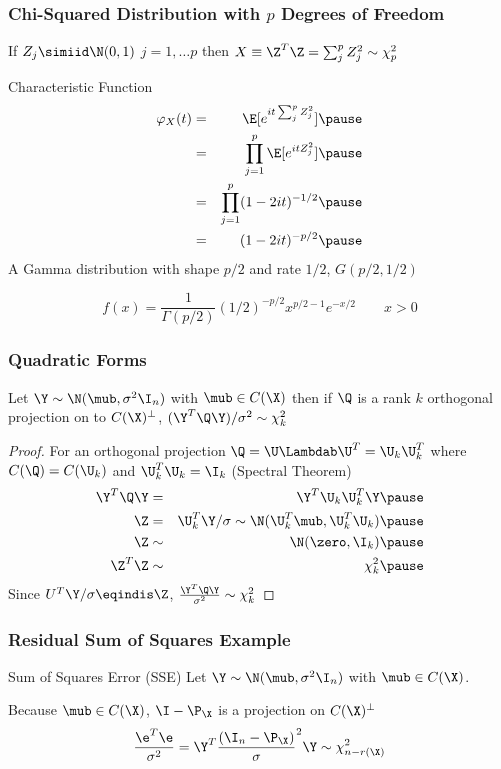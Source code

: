 \documentclass[handout]{beamer}
\begin{document}
\begin{frame}
  \frametitle{Chi-Squared Distribution with $p$ Degrees of Freedom}
If $Z_j \simiid \N(0,1)$ $j = 1, \ldots p$ then $X \equiv \Z^T\Z = \sum_j^p
Z_j^2 \sim \chi^2_p$  \pause

\begin{block}{Characteristic Function}
\begin{eqnarray*}
  \varphi_{X}(t) & = & \E[e^{it \sum_j^p
Z_j^2}] \pause \\
& = & \prod_{j=1}^p \E[e^{it Z_j^2 }] \pause \\
& = &  \prod_{j=1}^p (1 - 2 i t)^{-1/2} \pause \\
& = & (1 - 2 i t)^{-p/2} \pause
\end{eqnarray*}
A  Gamma distribution with shape $p/2$ and rate $1/2$, $G(p/2, 1/2)$ 

$$
f(x) = \frac{1}{\Gamma(p/2)} (1/2)^{-p/2} x^{p/2 - 1} e^{-x/2} \qquad x
> 0
$$
 \end{block}
\end{frame}
\begin{frame}
  \frametitle{Quadratic Forms}
  \begin{theorem}
  Let  $\Y \sim  \N(\mub, \sigma^2 \I_n)$ with $\mub \in C(\X)$ then if $\Q$ is
  a rank $k$ orthogonal  projection on to $C(\X)^{\perp}$,
$(\Y^T \Q \Y)/\sigma^2 \sim \chi^2_k$
  \end{theorem}
  \begin{proof}
    For an orthogonal projection  $\Q = \U \Lambdab \U^T 
    = \U_k \U_k^T$ where $C(\Q) = C(\U_k)$ and $\U_k^T\U_k = \I_k$
    (Spectral Theorem) \pause
    \begin{eqnarray*}
\Y^T\Q \Y  &=& \Y^T\U_k \U_k^T \Y      \pause \\
\Z & =  &\U_k^T \Y/ \sigma  \sim \N(\U_k^T\mub, \U_k^T\U_k) \pause \\
\Z & \sim & \N(\zero, \I_k) \pause \\
\Z^T\Z & \sim & \chi^2_k \pause 
    \end{eqnarray*}
Since $U^T\Y /\sigma \eqindis \Z$, $\frac{\Y^T\Q \Y}{\sigma^2} \sim
\chi^2_k$


  \end{proof}
\end{frame}

\begin{frame} \frametitle{Residual Sum of Squares Example}
 
\begin{block}{Sum of Squares Error  (SSE)}
Let $\Y \sim \N(\mub, \sigma^2 \I_n)$ with $\mub \in C(\X)$.


Because $\mub \in C(\X)$, $\I - \P_{\X}$ is a projection on
$C(\X)^{\perp}$ \pause $$\frac{\e^T\e}{\sigma^2} = \Y^T\frac{(\I_n - \P_\X)}\sigma^2 \Y  \sim
 \chi^2_{n - r(\X)}$$ 
\end{block}
\end{frame}
\end{document}
